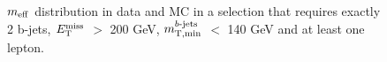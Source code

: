 \begin{figure}[h]
\centering
{}
\caption{$m_{\mathrm{eff}}$ distribution in data and MC in a selection that requires exactly 2 b-jets, $E_{\rm T}^{\mathrm{miss}}$ $>$ 200 GeV, $m_{\mathrm{T, min}}^{b\textrm{-jets}}$ $<$ 140 GeV and
at least one lepton.}
\label{fig:meff_in2b_no_corr}
\end{figure}

